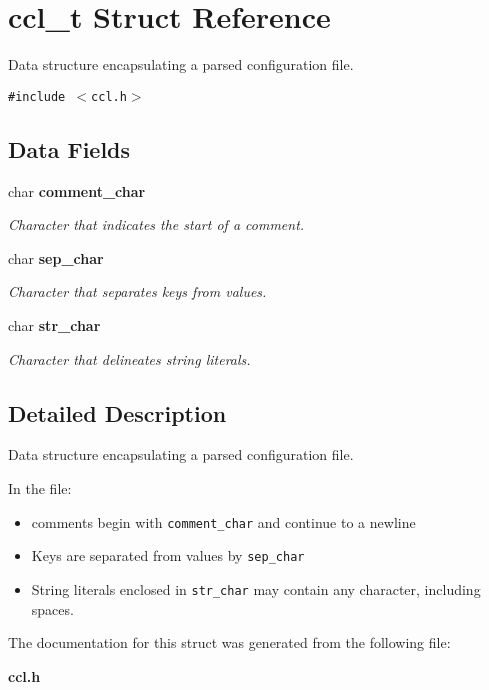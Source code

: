 \section{ccl\_\-t Struct Reference}
\label{structccl__t}
Data structure encapsulating a parsed configuration file.  


{\tt \#include $<$ccl.h$>$}

\subsection*{Data Fields}
\begin{CompactItemize}
\item 
char {\bf comment\_\-char}\label{structccl__t_o0}

\begin{CompactList}\small\item\em Character that indicates the start of a comment. \item\end{CompactList}\item 
char {\bf sep\_\-char}\label{structccl__t_o1}

\begin{CompactList}\small\item\em Character that separates keys from values. \item\end{CompactList}\item 
char {\bf str\_\-char}\label{structccl__t_o2}

\begin{CompactList}\small\item\em Character that delineates string literals. \item\end{CompactList}\end{CompactItemize}


\subsection{Detailed Description}
Data structure encapsulating a parsed configuration file. 

In the file:\begin{itemize}
\item comments begin with {\tt comment\_\-char} and continue to a newline\item Keys are separated from values by {\tt sep\_\-char} \item String literals enclosed in {\tt str\_\-char} may contain any character, including spaces. \end{itemize}




The documentation for this struct was generated from the following file:\begin{CompactItemize}
\item 
{\bf ccl.h}\end{CompactItemize}
